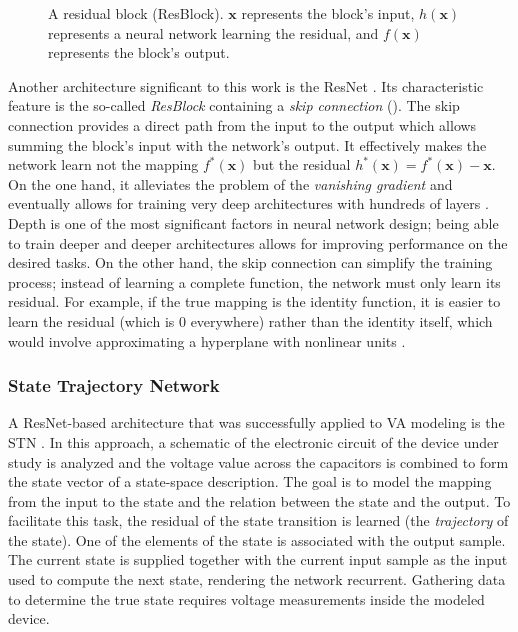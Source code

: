 \begin{figure}
  \centering
  
  \caption{A residual block (ResBlock). $\pmb{x}$ represents the block's input, $h(\pmb{x})$ represents a neural network learning the residual, and $f(\pmb{x})$ represents the block's output.}
  \label{fig:resblock}
\end{figure}

Another architecture significant to this work is the \ac{ResNet} \cite{He2015}. Its characteristic feature is the so-called \emph{\ac{ResBlock}} containing a \emph{skip connection} (). The skip connection provides a direct path from the input to the output which allows summing the block's input with the network's output. It effectively makes the network learn not the mapping $f^*(\pmb{x})$ but the residual $h^*(\pmb{x}) = f^*(\pmb{x}) - \pmb{x}$. On the one hand, it alleviates the problem of the \emph{vanishing gradient} \cite{Goodfellow-et-al-2016} and eventually allows for training very deep architectures with hundreds of layers \cite{He2015}. Depth is one of the most significant factors in neural network design; being able to train deeper and deeper architectures allows for improving performance on the desired tasks. On the other hand, the skip connection can simplify the training process; instead of learning a complete function, the network must only learn its residual. For example, if the true mapping is the identity function, it is easier to learn the residual (which is $0$ everywhere) rather than the identity itself, which would involve approximating a hyperplane with nonlinear units \cite{He2015}.

\subsubsection{State Trajectory Network}

A \ac{ResNet}-based architecture that was successfully applied to \ac{VA} modeling is the \acf{STN} \cite{Parker2019}. In this approach, a schematic of the electronic circuit of the device under study is analyzed and the voltage value across the capacitors is combined to form the state vector of a state-space description. The goal is to model the mapping from the input to the state and the relation between the state and the output. To facilitate this task, the residual of the state transition is learned (the \emph{trajectory} of the state). One of the elements of the state is associated with the output sample. The current state is supplied together with the current input sample as the input used to compute the next state, rendering the network recurrent. Gathering data to determine the true state requires voltage measurements inside the modeled device. 

